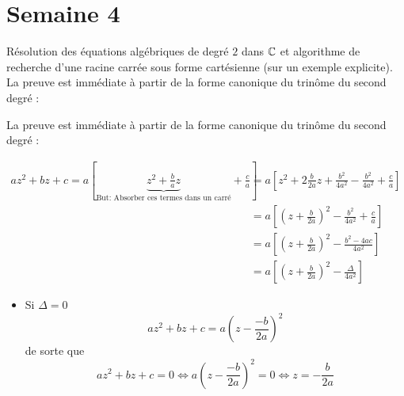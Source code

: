 \documentclass{article}
\renewenvironment{question_kholle}[2][ ]
{
	\subsection{\texorpdfstring{#2}{}}
	\notblank{#1}
	{
		\noindent #1
		\bigbreak
	}
	{}
	\begin{proof}
}
{
	\end{proof}
}
\begin{document}
\pagebreak\section{Semaine 4}
\begin{question_kholle}[{Considérons l'équation algébrique de degré 2:
    $$az^{2}+bz+c=0$$
    Où $z\in L$ est l'inconnue et $(a,b,c)\in\mathbb{C}^*\times\mathbb{C}^2$ sont des paramètres. Posons $\Delta = b^{2}-4ac$ que l'on appelle le discriminant de l'équation.
    \begin{itemize}
        \item Si $\Delta=0$, l'équation admet une unique solution dite double qui est $-\frac b{2a}$ et la forme factorisée du trinôme est
        $$
        az^2+bz+c = a \left( z + \frac b {2a} \right)^2
        $$
        \item Si $\Delta\neq0$, notons $\delta$ une racine carrée de $\Delta$, l'équation admet deux solutions distinctes $\frac{-b-\delta}{2a}$ et $\frac{-b+\delta}{2a}$ dites simples et la forme factorisée du trinôme est
        $$
        az^2+bz+c = a\left(z - \frac{-b-\delta}{2a}\right)\left(z - \frac{-b+\delta}{2a}\right)
        $$
    \end{itemize}
    }]{Résolution des équations algébriques de degré $2$ dans $\mathbb C$ et algorithme de recherche d'une racine carrée sous forme cartésienne (sur un exemple explicite).}
    La preuve est immédiate à partir de la forme canonique du trinôme du second degré :
    
    La preuve est immédiate à partir de la forme canonique du trinôme du second degré :
    
    \begin{align*}
        az^{2}+bz+c = a\left[ \underbrace{ z^{2}+\frac{b}{a}z }_{ \text{But: Absorber ces termes dans un carré} }+\frac{c}{a} \right] &= a\left[ z^{2}+2\frac{b}{2a}z +\frac{b^{2}}{4a^{2}}-\frac{b^{2}}{4a^{2}}+\frac{c}{a} \right]\\
        &=a \left[ \left( z+\frac{b}{2a} \right)^{2} - \frac{b^{2}}{4a^{2}}+\frac{c}{a} \right]  \\
        &=a \left[ \left( z+\frac{b}{2a} \right)^{2} - \frac{b^{2}-4ac}{4a^{2}}\right]  \\
        &=a \left[ \left( z+\frac{b}{2a} \right)^{2} - \frac{\Delta}{4a^{2}}\right] 
    \end{align*}
    \begin{itemize}
        \item Si $\Delta = 0$
        $$
        az^{2}+bz+c = a\left( z-\frac{-b}{2a} \right)^{2}
        $$
        de sorte que 
        $$
        az^{2}+bz+c = 0 \iff a\left( z-\frac{-b}{2a} \right)^{2} = 0 \iff z = -\frac{b}{2a}
        $$
        

\end{itemize}
\end{question_kholle}
\end{document}
